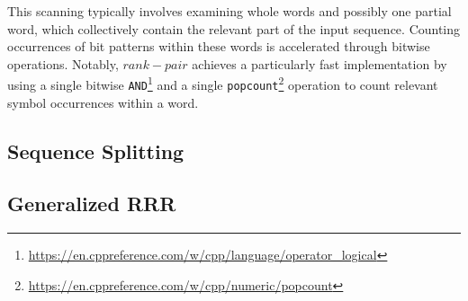 
\noindent This scanning typically involves examining whole words and possibly one partial word, which collectively contain the relevant part of the input sequence. Counting occurrences of bit patterns within these words is accelerated through bitwise operations. Notably, $rank-pair$ achieves a particularly fast implementation by using a single bitwise \texttt{AND}\footnote{\url{https://en.cppreference.com/w/cpp/language/operator_logical}} and a single \texttt{popcount}\footnote{\url{https://en.cppreference.com/w/cpp/numeric/popcount}} operation to count relevant symbol occurrences within a word.

\subsection{Sequence Splitting}

\lipsum[1]

\subsection{Generalized RRR}

\lipsum[1]
